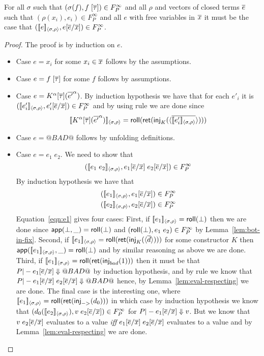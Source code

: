 \documentclass[preprint,nocopyrightspace]{sigplanconf}
\begin{document}
\begin{lemma}\label{lem:fund-thm-exp}
For all $\sigma$ such that $(\sigma(f),f\;[\overline{\tau}]) \in F_P^\infty$ and 
all $\rho$ and vectors of closed terms $\overline{e}$ such that $(\rho(x_i),e_i) \in F_P^\infty$ 
and all $e$ with free variables in $\overline{x}$ it must be the case 
that $([\![e]\!]_{\langle {\sigma},{\rho}\rangle},e[\overline{e}/\overline{x}]) \in F_P^\infty$.
\end{lemma}
\begin{proof} The proof is by induction on $e$. 
\begin{itemize}
  \item Case $e = x_i$ for some $x_i \in \overline{x}$ follows by the assumptions.
  \item Case $e = f\;[\overline{\tau}]$ for some $f$ follows by assumptions.
  \item Case $e = K^\alpha[\overline{\tau}](\overline{e'}^{\alpha})$. By induction hypothesis we 
  have that for each $e'_i$ it is $([\![e'_i]\!]_{\langle {\sigma},{\rho}\rangle},e'_i[\overline{e}/\overline{x}]) \in F_P^\infty$ and 
  by using rule  we are done since 
      \[ [\![K^{\alpha}[\overline{\tau}](\overline{e'}^{\alpha})]\!]_{\langle {\sigma},{\rho}\rangle} = \mathsf{roll}(\mathsf{ret}(\mathsf{inj}_{K}(\langle\overline{[\![e'_i]\!]_{\langle {\sigma},{\rho}\rangle}}\rangle))) \]
  \item Case $e = @BAD@$ follows by unfolding definitions.
  \item Case $e = e_1\;e_2$. We need to show that
     \[ ([\![e_1\;e_2]\!]_{\langle {\sigma},{\rho}\rangle},e_1[\overline{e}/\overline{x}]\;e_2[\overline{e}/\overline{x}]) \in F_P^\infty \] 
  By induction hypothesis we have that 
  \begin{eqnarray}
     ([\![e_1]\!]_{\langle {\sigma},{\rho}\rangle},e_1[\overline{e}/\overline{x}]) \in F_P^\infty \label{eqn:e1} \\ 
     ([\![e_2]\!]_{\langle {\sigma},{\rho}\rangle},e_2[\overline{e}/\overline{x}]) \in F_P^\infty \label{eqn:e2}
  \end{eqnarray}
  Equation~\ref{eqn:e1} gives four cases: First, if $[\![e_1]\!]_{\langle {\sigma},{\rho}\rangle} = \mathsf{roll}(\bot)$ then we 
  are done since $\mathsf{app}(\bot,\_) = \mathsf{roll}(\bot)$ and $(\mathsf{roll}(\bot), e_1\;e_2) \in F_P^\infty$ by Lemma~\ref{lem:bot-in-fix}.
  Second, if $[\![e_1]\!]_{\langle {\sigma},{\rho}\rangle} = \mathsf{roll}(\mathsf{ret}(\mathsf{inj}_{K}(\langle\overline{d}\rangle)))$ for some constructor
  $K$ then $\mathsf{app}([\![e_1]\!]_{\langle {\sigma},{\rho}\rangle},\_) = \mathsf{roll}(\bot)$ and by similar reasoning as above we are done.
  Third, if $[\![e_1]\!]_{\langle {\sigma},{\rho}\rangle} = \mathsf{roll}(\mathsf{ret}(\mathsf{inj}_{bad}(1)))$ then it must be that $P |- e_1[\overline{e}/\overline{x}] \Downarrow @BAD@$ by
  induction hypothesis, and by rule  we know that $P |- e_1[\overline{e}/\overline{x}]\;e_2[\overline{e}/\overline{x}] \Downarrow @BAD@$ hence, 
  by Lemma~\ref{lem:eval-respecting} we are done. The final case is the interesting one, where
  $[\![e_1]\!]_{\langle {\sigma},{\rho}\rangle} = \mathsf{roll}(\mathsf{ret}(\mathsf{inj}_{->}(d_0)))$ in which case by induction hypothesis we know that 
  $(d_0([\![e_2]\!]_{\langle {\sigma},{\rho}\rangle}), v\;e_2[\overline{e}/\overline{x}]) \in F_P^\infty$ for $P |- e_1[\overline{e}/\overline{x}] \Downarrow v$. But we know that 
  $v\;e_2[\overline{e}/\overline{x}]$ evaluates to a value {\em iff} $e_1[\overline{e}/\overline{x}]\;e_2[\overline{e}/\overline{x}]$ evaluates to a value and by 
  Lemma~\ref{lem:eval-respecting} we are done.
\end{itemize}
\end{proof}
\end{document}
